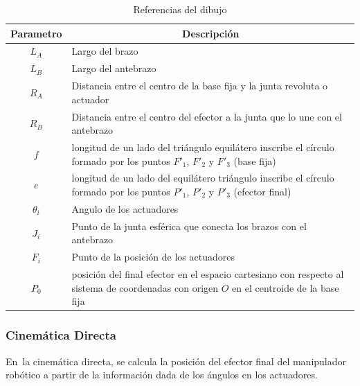         \begingroup
            \renewcommand{\arraystretch}{1.5}
            \begin{table}[H]
            \centering
            \begin{tabular}{c m{12cm}}
               \hline
               \textbf{Parametro}  & \multicolumn{1}{c}{\textbf{Descripción}}  \\
               \hline           \hline            
             $L_A$ & Largo del brazo \\
            \hline
             $L_B$ & Largo del antebrazo \\
            \hline
             $R_A$ & Distancia entre el centro de la base fija y la junta revoluta o actuador \\
            \hline
             $R_B$ & Distancia entre el centro del efector a la junta que lo une con el antebrazo\\
            \hline
             $f$ & longitud de un lado del triángulo equilátero inscribe el círculo formado por los puntos $F'_1$, $F'_2$ y $F'_3$ (base fija)\\
            \hline
             $e$ & longitud de un lado del equilátero triángulo inscribe el círculo formado por los puntos $P'_1$, $P'_2$ y $P'_3$ (efector final)\\
            \hline
             $\theta_i$ & Angulo de los actuadores\\
            \hline
             $J_i$ & Punto de la junta esférica que conecta los brazos con el antebrazo\\
            \hline            
             $F_i$ & Punto de la posición de los actuadores\\
            \hline  
             $P_0$ & posición del final efector en el espacio cartesiano con respecto al sistema de coordenadas con origen $O$ en el centroide de la base fija\\
            \hline            
            \end{tabular}
            \caption{Referencias del dibujo}
           \label{tab:cap4_tabla_12}
        \end{table}
        \endgroup     
        
        
        \newpage

\subsubsection{Cinemática Directa}\label{mb_cd}
        
        En\ la cinemática directa, se calcula la posición del efector final del manipulador robótico a partir de la información dada de los ángulos en los actuadores.


